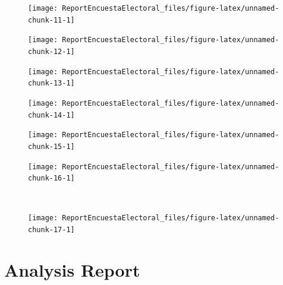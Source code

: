 \documentclass[10,a4paperpaper,]{article}
\begin{document}
\begin{figure}[!htb]
  \begin{minipage}{0.3\textwidth}
    \centering

\texttt{[image: ReportEncuestaElectoral\_files/figure-latex/unnamed-chunk-11-1]} 
  \end{minipage}\hfill
  \begin{minipage}{0.3\textwidth}
    \centering

\texttt{[image: ReportEncuestaElectoral\_files/figure-latex/unnamed-chunk-12-1]} 
  \end{minipage}
    \begin{minipage}{0.3\textwidth}
    \centering

\texttt{[image: ReportEncuestaElectoral\_files/figure-latex/unnamed-chunk-13-1]} 
  \end{minipage}
\end{figure}

\newpage

\begin{figure}[!htb]
\centering
  \begin{minipage}{0.3\textwidth}
    \centering

\texttt{[image: ReportEncuestaElectoral\_files/figure-latex/unnamed-chunk-14-1]} 
  \end{minipage}\hfill
\end{figure}

\begin{figure}[!htb]
  \begin{minipage}{0.3\textwidth}
  \centering

\texttt{[image: ReportEncuestaElectoral\_files/figure-latex/unnamed-chunk-15-1]} 

  \end{minipage}\hfill
  \begin{minipage}{0.3\textwidth}
    \centering

\texttt{[image: ReportEncuestaElectoral\_files/figure-latex/unnamed-chunk-16-1]} 
  \end{minipage}
  \\
  \centering
  \begin{minipage}{0.3\textwidth}
    \centering

\texttt{[image: ReportEncuestaElectoral\_files/figure-latex/unnamed-chunk-17-1]} 
\end{minipage}
\end{figure}

\newpage

\section{Analysis Report}
\end{document}
